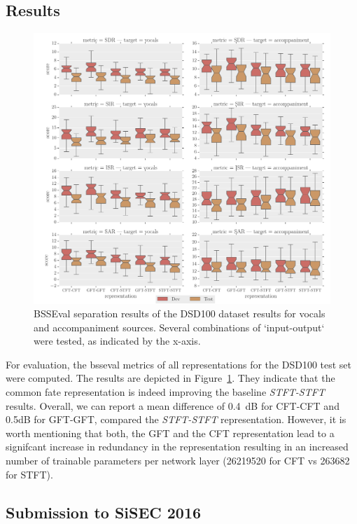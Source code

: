 \subsection{Results}

\begin{figure}[t]
\centering
\includegraphics[width=1.0\textwidth]{Chapters/06_Separation_Unknown/figures/boxplot.pdf}
\caption{BSSEval separation results of the DSD100 dataset results for vocals and accompaniment sources. Several combinations of `input-output` were tested, as indicated by the x-axis.}
\label{fig:deep_cft_boxplots}
\end{figure}

For evaluation, the bsseval metrics of all representations for the DSD100 test set were computed.
The results are depicted in Figure~\ref{fig:deep_cft_boxplots}.
They indicate that the common fate representation is indeed improving the baseline \emph{STFT-STFT} results.
Overall, we can report a mean difference of 0.4~dB for CFT-CFT and 0.5dB for GFT-GFT, compared the \emph{STFT-STFT} representation.
However, it is worth mentioning that both, the GFT and the CFT representation lead to a signifcant increase in redundancy in the representation resulting in an increased number of trainable parameters per network layer (26219520 for CFT vs 263682 for STFT).

\subsection{Submission to SiSEC 2016}
\label{ssec:performance}

